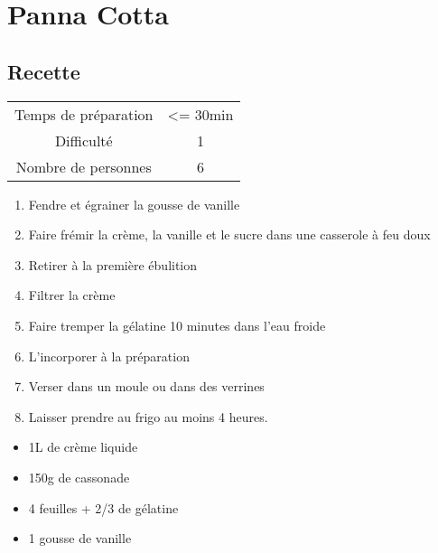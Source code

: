 \newpage
\section{Panna Cotta}
    \label{sec:Panna Cotta}
    \subsection{Recette}
    \vspace{1cm}


    \begin{center}
        \begin{tabular}{c|c}
            Temps de préparation & <= 30min \\
            Difficulté & 1 \\
            Nombre de personnes & 6 
        \end{tabular}
    \end{center}{}

    \vspace{1cm}
    \hline
    \vspace{1cm}

    \begin{minipage}{.7\textwidth}
        \begin{enumerate}
            \item Fendre et égrainer la gousse de vanille
	    \item Faire frémir la crème, la vanille et le sucre dans une casserole à feu doux
	    \item Retirer à la première ébulition
	    \item Filtrer la crème
	    \item Faire tremper la gélatine 10 minutes dans l'eau froide
	    \item L'incorporer à la préparation
	    \item Verser dans un moule ou dans des verrines
	    \item Laisser prendre au frigo au moins 4 heures.

        \end{enumerate}
    \end{minipage}
    \begin{minipage}{.3\textwidth}
        \begin{flushleft}
        \begin{itemize}
            \item 1L de crème liquide
	    \item 150g de cassonade
	    \item 4 feuilles + 2/3 de gélatine
	    \item 1 gousse de vanille

        \end{itemize}
        \end{flushleft}
    \end{minipage}
    
